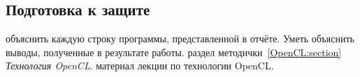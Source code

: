 { %
	\subsection{Подготовка к защите}
	\Large
	\begin{enumerate}
		 объяснить каждую строку программы, представленной в отчёте. Уметь объяснить выводы, полученные в результате работы.
		 раздел методички~\ref{OpenCL:section} \textit{Технология OpenCL}.
		 материал лекции по технологии OpenCL.
	\end{enumerate}
}